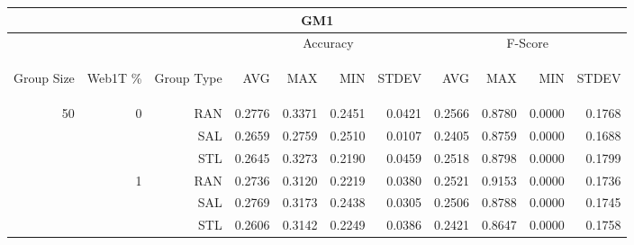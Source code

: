 \begin{center}
\begin{table}[htbp]
\begin{tabular}{ | r | r | r | r | r | r | r | r | r | r | r |}
\hline
\multicolumn{11}{|c|}{GM1}\\
\hline
 & & & \multicolumn{4}{|c|}{Accuracy} & \multicolumn{4}{|c|}{F-Score}\\ \cline{4-11}
\begin{sideways}Group Size\end{sideways} & \begin{sideways}Web1T \%\end{sideways} & \begin{sideways}Group Type\end{sideways} & \begin{sideways}AVG\end{sideways} & \begin{sideways}MAX\end{sideways} & \begin{sideways}MIN\end{sideways} & \begin{sideways}STDEV\end{sideways} & \begin{sideways}AVG\end{sideways} & \begin{sideways}MAX\end{sideways} & \begin{sideways}MIN\end{sideways} & \begin{sideways}STDEV\end{sideways}\\
\hline
\multirow{18}{*}{50}
 & \multirow{3}{*}{0} & RAN & 0.2776 & 0.3371 & 0.2451 & 0.0421 & 0.2566 & 0.8780 & 0.0000 & 0.1768\\ \cline{3-11}
 &   & SAL & 0.2659 & 0.2759 & 0.2510 & 0.0107 & 0.2405 & 0.8759 & 0.0000 & 0.1688\\ \cline{3-11}
 &   & STL & 0.2645 & 0.3273 & 0.2190 & 0.0459 & 0.2518 & 0.8798 & 0.0000 & 0.1799\\ \cline{2-11}
 & \multirow{3}{*}{1} & RAN & 0.2736 & 0.3120 & 0.2219 & 0.0380 & 0.2521 & 0.9153 & 0.0000 & 0.1736\\ \cline{3-11}
 &   & SAL & 0.2769 & 0.3173 & 0.2438 & 0.0305 & 0.2506 & 0.8788 & 0.0000 & 0.1745\\ \cline{3-11}
 &   & STL & 0.2606 & 0.3142 & 0.2249 & 0.0386 & 0.2421 & 0.8647 & 0.0000 & 0.1758\\ \cline{2-11}

\end{tabular}
\end{table}
\end{center}
